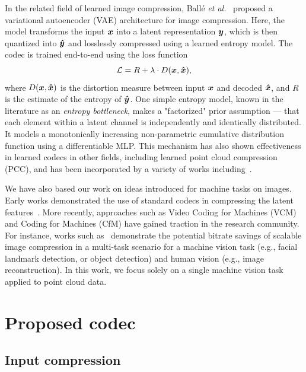 In the related field of learned image compression, Ball{\'e} \emph{et al.}~\cite{balle2018variational} proposed a variational autoencoder (VAE) architecture for image compression.
Here, the model transforms the input ${\boldsymbol{x}}$ into a latent representation ${\boldsymbol{y}}$, which is then quantized into ${\boldsymbol{\hat{y}}}$ and losslessly compressed using a learned entropy model.
The codec is trained end-to-end using the loss function
\begin{equation}
    \mathcal{L} = R + \lambda \cdot D({\boldsymbol{x}}, {\boldsymbol{\hat{x}}}),
    \label{eq:rd-loss}
\end{equation}
where $D({\boldsymbol{x}}, {\boldsymbol{\hat{x}}})$ is the distortion measure between input ${\boldsymbol{x}}$ and decoded ${\boldsymbol{\hat{x}}}$, and $R$ is the estimate of the entropy of ${\boldsymbol{\hat{y}}}$.
One simple entropy model, known in the literature as an \emph{entropy bottleneck}, makes a "factorized" prior assumption --- that each element within a latent channel is independently and identically distributed.
It models a monotonically increasing non-parametric cumulative distribution function using a differentiable MLP.
This mechanism has also shown effectiveness in learned codecs in other fields, including learned point cloud compression (PCC), and has been incorporated by a variety of works including~\cite{yan2019deep,he2022density,pang2022graspnet,fu2022octattention,you2022ipdae}.

We have also based our work on ideas introduced for machine tasks on images.
Early works demonstrated the use of standard codecs in compressing the latent features~\cite{choi2018mmsp}.
More recently, approaches such as Video Coding for Machines (VCM)~\cite{duan2020vcm} and Coding for Machines (CfM) have gained traction in the research community.
For instance, works such as~\cite{hu2020towardscfhmvscalable,choi2022sichm} demonstrate the potential bitrate savings of scalable image compression in a multi-task scenario for a machine vision task (e.g., facial landmark detection, or object detection) and human vision (e.g., image reconstruction).
In this work, we focus solely on a single machine vision task applied to point cloud data.




\section{Proposed codec}
\label{sec:proposed-codec}

\subsection{Input compression}


